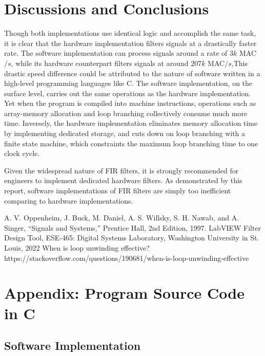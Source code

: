 \documentclass[conference]{IEEEtran}
\begin{document}
\section{Discussions and Conclusions} \label{conclusion}

Though both implementations use identical logic and accomplish the same task, it is clear that the hardware implementation filters signals at a drastically faster rate. The software implementation can process signals around a rate of $3k$ MAC$/s$, while its hardware counterpart filters signals at around $207k$ MAC$/s$,This drastic speed difference could be attributed to the nature of software written in a high-level programming languages like C. The software implementation, on the surface level, carries out the same operations as the hardware implementation. Yet when the program is compiled into machine instructions, operations such as array-memory allocation and loop branching collectively consume much more time. Inversely, the hardware implementation eliminates memory allocation time by implementing dedicated storage, and cuts down on loop branching with a finite state machine, which constraints the maximum loop branching time to one clock cycle. 

Given the widespread nature of FIR filters, it is strongly recommended for engineers to implement dedicated hardware filters. As demonstrated by this report, software implementations of FIR filters are simply too inefficient comparing to hardware implementations.


\begin{thebibliography}{00}
 A. V. Oppenheim, J. Buck, M. Daniel, A. S. Willsky, S. H. Nawab, and A. Singer, ``Signals and Systems,'' Prentice Hall, 2nd Edition, 1997.
 LabVIEW Filter Design Tool, ESE-465: Digital Systems Laboratory, Washington University in St. Louis, 2022
 When is loop unwinding effective?\\ https://stackoverflow.com/questions/190681/when-is-loop-unwinding-effective
\end{thebibliography}

\newpage
\onecolumn
\section{Appendix: Program Source Code in C}
\subsection{Software Implementation}

\end{document}
